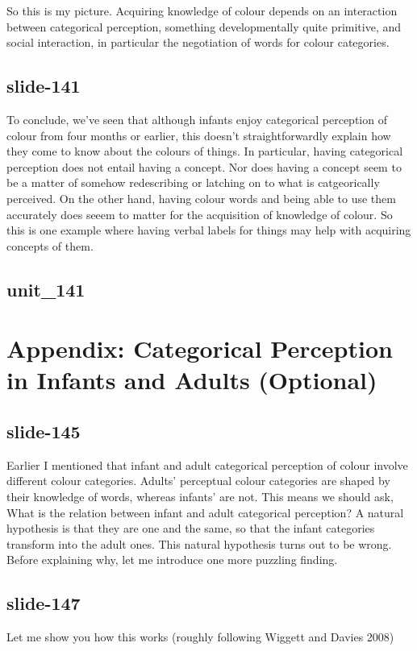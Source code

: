 \documentclass[12pt,\papersize]{extarticle}
\begin{document}
So this is my picture.
Acquiring knowledge of colour depends on an interaction between categorical perception, something developmentally quite primitive, and social interaction, in
particular the negotiation of words for colour categories.

\subsection{slide-141}
To conclude, we've seen that although infants enjoy categorical perception of colour from four months or earlier,
this doesn't straightforwardly explain how they come to know about the colours of things.
In particular, having categorical perception does not entail having a concept.
Nor does having a concept seem to be a matter of somehow redescribing or latching on to what is catgeorically perceived.
On the other hand, having colour words and being able to use them accurately does seeem to matter for the acquisition of knowledge of colour.
So this is one example where having verbal labels for things may help with acquiring concepts of them.

\subsection{unit\_141}


\section{Appendix: Categorical Perception in Infants and Adults (Optional)}

\subsection{slide-145}
Earlier I mentioned that infant and adult categorical perception of colour involve different colour categories.
Adults’ perceptual colour categories are shaped by their knowledge of words, whereas infants’ are not.
This means we should ask, What is the relation between infant and adult categorical perception?
A natural hypothesis is that they are one and the same, so that the infant categories transform into the adult ones.
This natural hypothesis turns out to be wrong.
Before explaining why, let me introduce one more puzzling finding.

\subsection{slide-147}
Let me show you how this works (roughly following Wiggett and Davies 2008)
\end{document}
